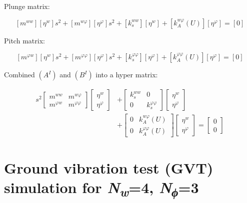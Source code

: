 \documentclass[11pt]{article}
\begin{document}
Plunge matrix:

\[
\left[ m^{ww} \right]\left[ \eta^{w} \right] s^{2}
+ \left[ m^{w\varphi} \right]\left[ \eta^{\varphi} \right] s^{2}
+ \left[ k_{s}^{ww} \right]\left[ \eta^{w} \right]
+ \left[ k_{A}^{w\varphi}(U) \right]\left[ \eta^{\varphi} \right]
= \left[ 0 \right]
\]

Pitch matrix:

\[
\left[ m^{\varphi w} \right]\left[ \eta^{w} \right] s^{2}
+ \left[ m^{\varphi\varphi} \right]\left[ \eta^{\varphi} \right] s^{2}
+ \left[ k_{s}^{\varphi\varphi} \right]\left[ \eta^{\varphi} \right]
+ \left[ k_{A}^{\varphi\varphi}(U) \right]\left[ \eta^{\varphi} \right]
= \left[ 0 \right]
\]

Combined \((A^{I})\) and \((B^{I})\) into a hyper matrix:

\begin{equation}
\begin{aligned}
s^{2}
\begin{bmatrix}
m^{ww}       & m^{w\varphi} \\
m^{\varphi w} & m^{\varphi\varphi}
\end{bmatrix}
\begin{bmatrix}
\eta^{w} \\
\eta^{\varphi}
\end{bmatrix}
&+
\begin{bmatrix}
k_{s}^{ww} & 0 \\
0          & k_{s}^{\varphi\varphi}
\end{bmatrix}
\begin{bmatrix}
\eta^{w} \\
\eta^{\varphi}
\end{bmatrix}
\\
&+
\begin{bmatrix}
0                  & k_{A}^{w\varphi}(U) \\
0                  & k_{A}^{\varphi\varphi}(U)
\end{bmatrix}
\begin{bmatrix}
\eta^{w} \\
\eta^{\varphi}
\end{bmatrix}
=
\begin{bmatrix}
0 \\
0
\end{bmatrix}
\end{aligned}
\end{equation}

\section{\texorpdfstring{Ground vibration test (GVT) simulation for
\emph{N\textsubscript{w}}=4,
\emph{N\textsubscript{ϕ}}=3}{Ground vibration test (GVT) simulation for Nw=4, Nϕ=3}}\label{ground-vibration-test-gvt-simulation-for-nw4-nux3d53}
\end{document}
